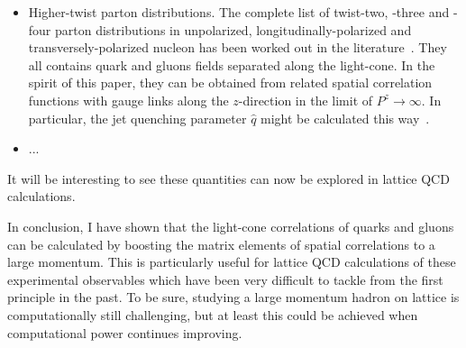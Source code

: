 \begin{itemize}
\item{Higher-twist parton distributions. The complete list of twist-two, -three and -four parton
distributions in unpolarized, longitudinally-polarized and transversely-polarized nucleon has been
worked out in the literature~\cite{Ellis:1982cd}. They all contains quark and gluons fields separated
along the light-cone. In the spirit of this paper, they can be obtained from related spatial correlation
functions with gauge links along the $z$-direction in the limit of $P^z \rightarrow \infty$. In particular, the
jet quenching parameter $\hat q$ might be calculated this way~\cite{Majumder:2012sh}.}

\item{...}

\end{itemize}
It will be interesting to see these quantities can now be explored in lattice QCD calculations.

In conclusion, I have shown that the light-cone correlations of quarks and gluons
can be calculated by boosting the matrix elements
of spatial correlations to a large momentum. This is particularly
useful for lattice QCD calculations of these experimental observables
which have been very difficult to tackle from the first principle in the past.
To be sure, studying a large momentum hadron on lattice is computationally
still challenging, but at least this could be achieved when computational power continues
improving.
